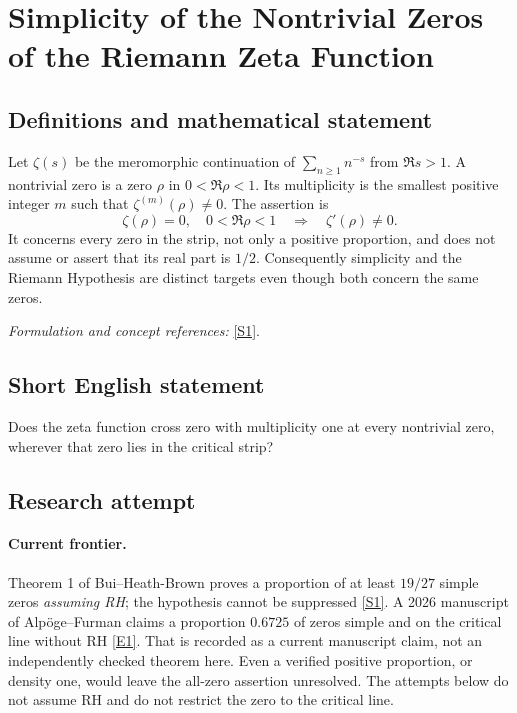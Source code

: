 \documentclass[11pt,a4paper]{article}
\newcommand{\sref}[2]{\hyperlink{source:#1:#2}{[S#2]}}
\newcommand{\eref}[2]{\hyperlink{extra:#1:#2}{[E#2]}}
\newif\ifshowcatalogue
\newcommand{\cataloguescope}[1]{\ifshowcatalogue
 \paragraph{Exact scope in the supplied catalogue.}
 \begin{quote}\small #1\end{quote}\fi}
\numberwithin{equation}{section}
\begin{document}
\setcounter{section}{170}
\clearpage
\section{\texorpdfstring{Simplicity of the Nontrivial Zeros of the Riemann Zeta Function}{Simplicity of the Nontrivial Zeros of the Riemann Zeta Function}}\label{171}
\subsection{Definitions and mathematical statement}
Let $\zeta(s)$ be the meromorphic continuation of $\sum_{n\ge1}n^{-s}$ from $\Re s>1$. A nontrivial zero is a zero $\rho$ in $0<\Re\rho<1$. Its multiplicity is the smallest positive integer $m$ such that $\zeta^{(m)}(\rho)\ne0$. The assertion is
\[
 \zeta(\rho)=0,\quad0<\Re\rho<1\quad\Longrightarrow\quad\zeta'(\rho)\ne0.
\]
It concerns every zero in the strip, not only a positive proportion, and does not assume or assert that its real part is $1/2$. Consequently simplicity and the Riemann Hypothesis are distinct targets even though both concern the same zeros.
\par\smallskip\textit{Formulation and concept references:} \sref{171}{1}.
\cataloguescope{Prove that zeta'(rho) is nonzero for every nontrivial zero rho of the Riemann zeta function; equivalently, every nontrivial zero of zeta(s) has multiplicity exactly one.}
\subsection{Short English statement}
Does the zeta function cross zero with multiplicity one at every nontrivial zero, wherever that zero lies in the critical strip?
\subsection{Research attempt}

\paragraph{Current frontier.}
Theorem 1 of Bui--Heath-Brown proves a proportion of at least $19/27$ simple
zeros \emph{assuming RH}; the hypothesis cannot be suppressed
\sref{171}{1}. A 2026 manuscript of Alp\"oge--Furman claims a proportion
$0.6725$ of zeros simple and on the critical line without RH
\eref{171}{1}. That is recorded as a current manuscript claim, not an
independently checked theorem here. Even a verified positive proportion,
or density one, would leave the all-zero assertion unresolved. The attempts
below do not assume RH and do not restrict the zero to the critical line.
\end{document}

